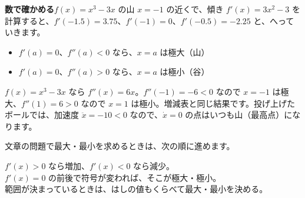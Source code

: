 \medskip
\noindent\textbf{数で確かめる}\quad $f(x)=x^3-3x$ の山 $x=-1$ の近くで、傾き $f'(x)=3x^2-3$ を計算すると、$f'(-1.5)=3.75$、$f'(-1)=0$、$f'(-0.5)=-2.25$ と、へっていきます。

\begin{itemize}[leftmargin=1.6\zw, itemsep=1pt, topsep=2pt, label={\color{bkTheme}●}]
\item $f'(a)=0$、$f''(a)<0$ なら、$x=a$ は極大（山）
\item $f'(a)=0$、$f''(a)>0$ なら、$x=a$ は極小（谷）
\end{itemize}
$f(x)=x^3-3x$ なら $f''(x)=6x$。$f''(-1)=-6<0$ なので $x=-1$ は極大、$f''(1)=6>0$ なので $x=1$ は極小。増減表と同じ結果です。投げ上げたボールでは、加速度 $\ddot{x}=-10<0$ なので、$\dot{x}=0$ の点はいつも山（最高点）になります。


\label{bk:5-7:tejun}文章の問題で最大・最小を求めるときは、次の順に進めます。

\begin{bkfigure}
\end{bkfigure}

\begin{taisetsu}
$f'(x)>0$ なら増加、$f'(x)<0$ なら減少。\\
$f'(x)=0$ の前後で符号が変われば、そこが極大・極小。\\
範囲が決まっているときは、はしの値もくらべて最大・最小を決める。
\end{taisetsu}

